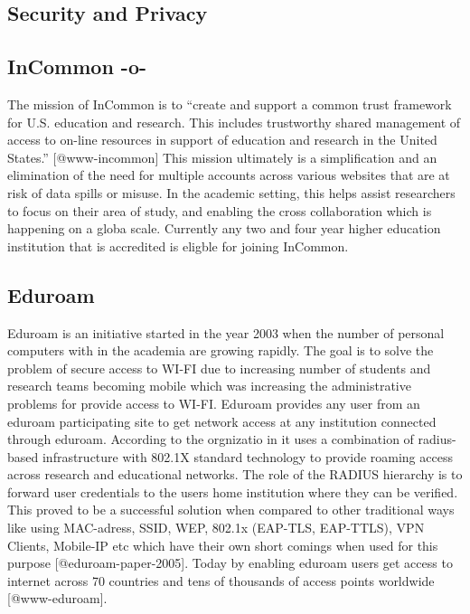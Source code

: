 \subsection{Security and Privacy}

\subsection{InCommon -o-}

The mission of InCommon is to ``create and support a common trust
framework for U.S. education and research.  This includes trustworthy
shared management of access to on-line resources in support of
education and research in the United States.'' [@www-incommon]
This mission ultimately is a simplification and an elimination of the
need for multiple accounts across various websites that are at risk of
data spills or misuse.  In the academic setting, this helps assist
researchers to focus on their area of study, and enabling the cross
collaboration which is happening on a globa scale.  Currently any two
and four year higher education institution that is accredited is
eligble for joining InCommon.

\subsection{Eduroam}

Eduroam is an initiative started in the year 2003 when the number of
personal computers with in the academia are growing rapidly. The goal
is to solve the problem of secure access to WI-FI due to increasing
number of students and research teams becoming mobile which was
increasing the administrative problems for provide access to
WI-FI. Eduroam provides any user from an eduroam participating site to
get network access at any institution connected through
eduroam. According to the orgnizatio in it uses a combination of
radius-based infrastructure with 802.1X standard technology to provide
roaming access across research and educational networks. The role of
the RADIUS hierarchy is to forward user credentials to the users home
institution where they can be verified. This proved to be a successful
solution when compared to other traditional ways like using
MAC-adress, SSID, WEP, 802.1x (EAP-TLS, EAP-TTLS), VPN Clients,
Mobile-IP etc which have their own short comings when used for this
purpose [@eduroam-paper-2005]. Today by enabling eduroam users get
access to internet across 70 countries and tens of thousands of access
points worldwide [@www-eduroam].


